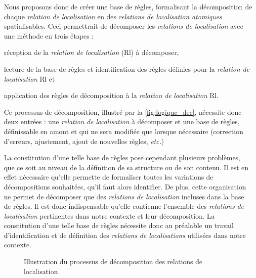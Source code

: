 Nous proposons donc de créer une base de règles, formalisant la
décomposition de chaque \emph{relation de localisation} en des
\emph{relations de localisation atomiques} spatialisables. Ceci
permettrait de décomposer les \emph{relations de localisation} avec
une méthode en trois étapes :
%
\begin{enumerate*}[label=(\arabic*)] 
\item réception de la \emph{relation de localisation}
  ($\text{Rl}$) à décomposer,
\item lecture de la base de règles et identification des règles
  définies pour la \emph{relation de localisation}
  $\text{Rl}$ et
\item application des règles de décomposition à la \emph{relation de
    localisation} $\text{Rl}$.
\end{enumerate*}
%
Ce processus de décomposition, illustré par la
\autoref{fig:logique_dec}, nécessite donc deux entrées : une
\emph{relation de localisation} à décomposer et une base de règles,
définissable en amont et qui ne sera modifiée que lorsque nécessaire
(\eg correction d'erreurs, ajustement, ajout de nouvelles règles,
\emph{etc.})

La constitution d'une telle base de règles pose cependant plusieurs
problèmes, que ce soit au niveau de la définition de sa structure ou
de son contenu. Il est en effet nécessaire qu'elle permette de
formaliser toutes les variations de décompositions souhaitées, qu'il
faut alors identifier. De plus, cette organisation ne permet de
décomposer que des \emph{relations de localisation} incluses dans la
base de règles. Il est donc indispensable qu'elle contienne l'ensemble
des \emph{relations de localisation} pertinentes dans notre contexte
et leur décomposition. La constitution d'une telle base de règles
nécessite donc au préalable un travail d'identification et de
définition des \emph{relations de localisations} utilisées dans notre
contexte.

\begin{figure}
  \centering
  
  \caption{Illustration du processus de décomposition des relations de
  localisation}
  \label{fig:logique_dec}
\end{figure}

